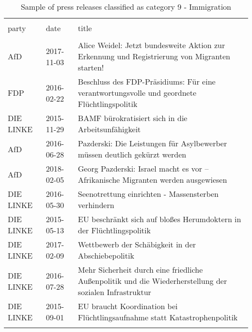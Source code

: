 
\begin{table}[!htbp] \centering 
  \caption{Sample of press releases classified as category 9 - Immigration} 
  \label{tab:7-document-samples} 
\begin{tabularx}{\textwidth}{stX} 
\\[-1.8ex]\hline 
\hline \\[-1.8ex] 
party & date & title \\ 
\hline \\[-1.8ex] 
AfD & 2017-11-03 & Alice Weidel: Jetzt bundesweite Aktion zur Erkennung und Registrierung von Migranten starten! \\ 
FDP & 2016-02-22 & Beschluss des FDP-Präsidiums: Für eine verantwortungsvolle und geordnete Flüchtlingspolitik \\ 
DIE LINKE & 2015-11-29 & BAMF bürokratisiert sich in die Arbeitsunfähigkeit \\ 
AfD & 2016-06-28 & Pazderski: Die Leistungen für Asylbewerber müssen deutlich gekürzt werden \\ 
AfD & 2018-02-05 & Georg Pazderski: Israel macht es vor – Afrikanische Migranten werden ausgewiesen \\ 
DIE LINKE & 2016-05-30 & Seenotrettung einrichten - Massensterben verhindern \\ 
DIE LINKE & 2015-05-13 & EU beschränkt sich auf bloßes Herumdoktern in der Flüchtlingspolitik \\ 
DIE LINKE & 2017-02-09 & Wettbewerb der Schäbigkeit in der Abschiebepolitik \\ 
DIE LINKE & 2016-07-28 & Mehr Sicherheit durch eine friedliche Außenpolitik und die Wiederherstellung der sozialen Infrastruktur  \\ 
DIE LINKE & 2015-09-01 & EU braucht Koordination bei Flüchtlingsaufnahme statt Katastrophenpolitik \\ 
\hline \\[-1.8ex] 
\end{tabularx} 
\end{table} 
